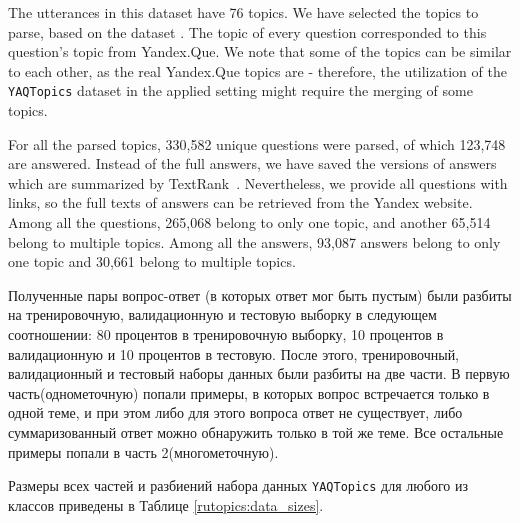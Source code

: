 The utterances in this dataset have 76 topics. We have selected the topics to parse, based on the dataset \cite{dp_topics}. The topic of every question corresponded to this question's topic from Yandex.Que. We note that some of the topics can be similar to each other, as the real Yandex.Que topics are - therefore, the utilization of the \texttt{YAQTopics} dataset in the applied setting might require the merging of some topics. 

 For all the parsed topics, 330,582 unique questions were parsed, of which 123,748 are answered. Instead of the full answers, we have saved the versions of answers which are summarized by TextRank~\cite{summarizer}. Nevertheless, we provide all questions with links, so the full texts of answers can be retrieved from the Yandex website.
Among all the questions, 265,068 belong to only one topic, and another 65,514 belong to multiple topics. Among all the answers, 93,087 answers belong to only one topic and 30,661 belong to multiple topics. 

Полученные пары вопрос-ответ (в которых ответ мог быть пустым) были разбиты на тренировочную, валидационную и тестовую выборку в следующем соотношении: 80 процентов в тренировочную выборку, 10 процентов в валидационную и 10 процентов в тестовую. После этого, тренировочный, валидационный и тестовый наборы данных были разбиты на две части. В первую часть(однометочную) попали примеры, в которых вопрос встречается только в одной теме, и при этом либо для этого вопроса ответ не существует, либо суммаризованный ответ можно обнаружить только в той же теме. Все остальные примеры попали в часть 2(многометочную).

Размеры всех частей и разбиений набора данных \texttt{YAQTopics} для любого из классов приведены в Таблице \ref{rutopics:data_sizes}. 


